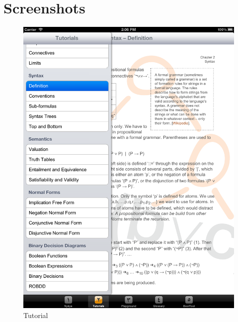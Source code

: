\chapter{Screenshots}

\begin{figure}[htbp]
\begin{center}
\includegraphics[width=12cm]{pics/S_Tutorials.png}
\caption{Tutorial}
\label{fig:ScreenshotTutorials}
\end{center}
\end{figure}

